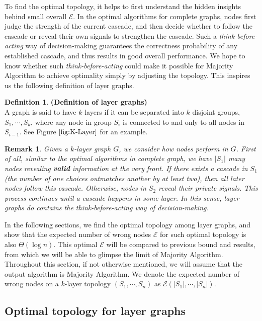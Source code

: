 \documentclass[a4paper,UKenglish]{lipics}
\newtheorem{rmk}{Remark}
\theoremstyle{definition}
\newtheorem{defn}[thm]{Definition}
\begin{document}
To find the optimal topology, it helps to first understand the hidden insights behind small overall $\mathcal{E}$.
In the optimal algorithms for complete graphs, nodes first judge the strength of the current cascade,
	and then decide whether to follow the cascade or reveal their own signals to strengthen the cascade.
Such a \emph{think-before-acting} way of decision-making guarantees the correctness probability of any established cascade, and thus results in good overall performance.
We hope to know whether such \emph{think-before-acting} could make it possible for Majority Algorithm to achieve optimality simply by adjusting the topology.
This inspires us the following definition of layer graphs.

\begin{defn} {\bf (Definition of layer graphs)}
\\
A graph is said to have $k$ layers if it can be separated into $k$ disjoint groups, $S_1, \dotsb, S_k$, where any node in group $S_i$ is connected to and only to all nodes in $S_{i-1}$. See Figure $\ref{fig:K-Layer}$ for an example.
\end{defn}

\begin{rmk}
\label{rmk2}
Given a $k$-layer graph $G$, we consider how nodes perform in $G$.
First of all, similar to the optimal algorithms in complete graph,
	we have $|S_1|$ many nodes revealing \textbf{valid} information at the very front.
If there exists a cascade in $S_1$ (the number of one choices outmatches another by at least two),
	then all later nodes follow this cascade.
Otherwise, nodes in $S_2$ reveal their private signals.
This process continues until a cascade happens in some layer.
In this sense, layer graphs do contains the think-before-acting way of decision-making.
\end{rmk}

In the following sections, we find the optimal topology among layer graphs, 
	and show that the expected number of wrong nodes $\mathcal{E}$ for such optimal topology is also $\Theta(\log n)$. 
This optimal $\mathcal{E}$ will be compared to previous bound and results,
	from which we will be able to glimpse the limit of Majority Algorithm. 
Throughout this section, if not otherwise mentioned, we will assume that the output algorithm is Majority Algorithm.
We denote the expected number of wrong nodes on a $k$-layer topology $(S_1, \dotsb, S_n)$ as $\mathcal{E}(|S_1|, \dotsb, |S_n|)$.

\subsection {Optimal topology for layer graphs}
\end{document}
